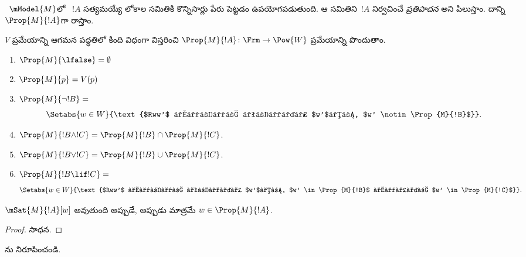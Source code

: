 \documentclass[../../../include/open-logic-section]{subfiles}
\begin{document}


~$\mModel{M}$లో ~$!A$ సత్యమయ్యే లోకాల సమితికి కొన్నిసార్లు పేరు పెట్టడం ఉపయోగపడుతుంది. ఆ సమితిని~$!A$ నిర్వచించే \emph{ప్రతిపాదన} అని పిలుస్తాం. దాన్ని $\Prop{M}{!A}$గా రాస్తాం.

\begin{defn}
  $V$ ప్రమేయాన్ని ఆగమన పద్ధతిలో కింది విధంగా విస్తరించి $\Prop{M}{!A} \colon \Frm
  \to \Pow{W}$ ప్రమేయాన్ని పొందుతాం.
  \begin{enumerate}
  \item $\Prop{M}{\lfalse} = \emptyset$
  \item $\Prop{M}{p} = V(p)$
  \item $\Prop{M}{\lnot !B} = {}$
    \[
      \Setabs{w \in W}{\text{$Rww'$ అయ్యే ప్రతి $w'$కు, $w'
          \notin \Prop{M}{!B}$}}.
    \]
  \item $\Prop{M}{!B \land !C} = \Prop{M}{!B} \cap \Prop{M}{!C}$.
  \item $\Prop{M}{!B \lor !C} = \Prop{M}{!B} \cup \Prop{M}{!C}$.
  \item $\Prop{M}{!B \lif !C} = {}$
    \[
      \Setabs{w \in W}{\text{$Rww'$ అయ్యే ప్రతి $w'$కు, $w'
          \in \Prop{M}{!B}$ అయితే $w' \in \Prop{M}{!C}$}}.
    \]
  \end{enumerate}
\end{defn}

\begin{prop}
  $\mSat{M}{!A}[w]$ అవుతుంది అప్పుడే, అప్పుడు మాత్రమే $w \in \Prop{M}{!A}$.
\end{prop}

\begin{proof}
  సాధన.
\end{proof}

\begin{prob}
  ను నిరూపించండి.
\end{prob}
\end{document}
